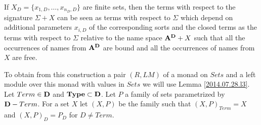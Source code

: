 \documentclass[11pt]{article}
\begin{document}
If $X_D=\{x_{1,D},\dots,x_{n_D,D}\}$ are finite sets, then the terms with respect to the signature $\Sigma+X$ can be seen as terms with respect to $\Sigma$ which depend on additional parameters $x_{i,D}$ of the corresponding sorts and the closed terms as the terms with respect to $\Sigma$ relative to the name space ${\bf A}^{\bf D}+X$ such that all the occurrences of names from ${\bf A}^{\bf D}$ are bound and all the occurrences of names from $X$ are free. 

To obtain from this construction a pair $(R,LM)$ of a monad on $Sets$ and a left module over this monad with values in $Sets$ we will use Lemma \ref{2014.07.28.l3}. Let $Term\in{\bf D}$ and ${\bf Type}\subset{\bf D}$. Let $P$ a family of sets parametrized by ${\bf D}-{Term}$. For a set $X$ let $(X,P)$ be the family such that $(X,P)_{Term}=X$ and $(X,P)_{D}=P_{D}$ for $D\ne Term$. 
\end{document}
